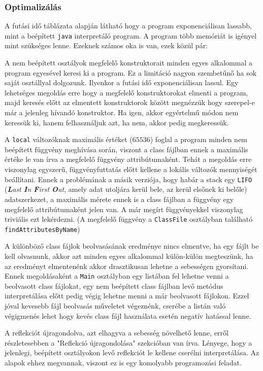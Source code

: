 \subsubsection{Optimalizálás}

A futási idő táblázata alapján látható hogy a program exponenciálisan lassabb, mint a beépített \lstinline{java} interpretáló program. A program több memóriát is igényel mint szükséges lenne. Ezeknek számos oka is van, ezek közül pár:

\begin{compactitem}
	\item A nem beépített osztályok megfelelő konstruktorait minden egyes alkalommal a program egyesével keresi ki a program. Ez a limitáció nagyon szembetűnő ha sok saját osztállyal dolgozunk. Ilyenkor a futási idő exponenciálisan lassul. Egy lehetséges megoldás erre hogy a megfelelő konstruktorokat elmenti a program, majd keresés előtt az elmentett konstruktorok között megnézzük hogy szerepel-e már a jelenleg hívandó konstruktor. Ha igen, akkor egyértelmű módon nem keressük ki, hanem felhasználjuk azt, ha nem, akkor pedig megkeressük.
	\item A \lstinline{local} változóknak maximális értéket ($65536$) foglal a program minden nem beépített függvény meghívása során, viszont a class fájlban ennek a maximális értéke le van írva a megfelelő függvény attribútumaként. Tehát a megoldás erre viszonylag egyszerű, függvényfuttatás előtt kellene a lokális változók mennyiségét beállítani. Ennek a problémának a másik verziója, hogy habár a stack egy \lstinline{LIFO} (\textit{\textbf{L}ast \textbf{I}n \textbf{F}irst \textbf{O}ut}, amely adat utoljára kerül bele, az kerül elsőnek ki belőle) adatszerkezet, a maximális mérete ennek is a class fájlban a függvény egy megfelelő attribútumaként jelen van. A már megírt függvényekkel viszonylag triviális ezt lekérdezni. (A megfelelő függvény a \lstinline{ClassFile} osztályban található \lstinline{findAttributesByName})
	\item A különböző class fájlok beolvasásának eredménye nincs elmentve, ha egy fájlt be kell olvasnunk, akkor azt minden egyes alkalommal külön-külön megteszünk, ha az eredményt elmentenénk akkor drasztikusan lehetne a sebességen gyorsítani. Ennek megoldásaként a \lstinline{Main} osztályban egy listában fel lehetne venni a beolvasott class fájlokat, egy nem beépített class fájlban levő metódus interpretálása előtt pedig végig lehetne menni a már beolvasott fájlokon. Ezzel jóval kevesebb fájl beolvasás műveletet végeznénk, cserébe a listán való végigmenés lehet hogy kevés class fájl használata esetén negatív hatással lenne.
	\item A reflekciót újragondolva, azt elhagyva a sebesség növelhető lenne, erről részletesebben a "Reflekció újragondolása" szekcióban van írva. Lényege, hogy a jelenlegi, beépített osztályokon levő reflekciót le kellene cserélni interpretálása. Az alapok ehhez megvannak, viszont ez is egy komolyabb programozási feladat.
\end{compactitem}

